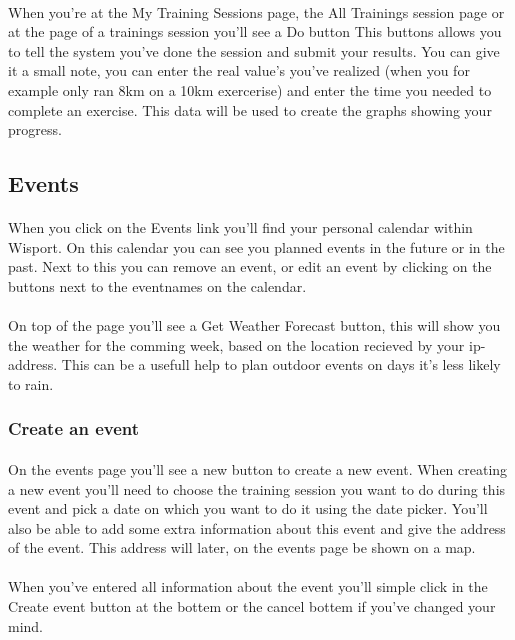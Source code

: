 \documentclass[11pt,a4paper]{scrartcl}
\begin{document}
\paragraph{}When you're at the My Training Sessions page, the All Trainings session page or at the page of a trainings session you'll see a Do button This buttons allows you to tell the system you've done the session and submit your results. You can give it a small note, you can enter the real value's you've realized (when you for example only ran 8km on a 10km exercerise) and enter the time you needed to complete an exercise. This data will be used to create the graphs showing your progress.

\subsection{Events} 
\paragraph{}When you click on the Events link you'll find your personal calendar within Wisport. On this calendar you can see you planned events in the future or in the past. Next to this you can remove an event, or edit an event by clicking on the buttons next to the eventnames on the calendar.
\paragraph{}On top of the page you'll see a Get Weather Forecast button, this will show you the weather for the comming week, based on the location recieved by your ip-address. This can be a usefull help to plan outdoor events on days it's less likely to rain.
\subsubsection{Create an event}
\paragraph{}On the events page you'll see a new button to create a new event. When creating a new event you'll need to choose the training session you want to do during this event and pick a date on which you want to do it using the date picker. You'll also be able to add some extra information about this event and give the address of the event. This address will later, on the events page be shown on a map.
\paragraph{}When you've entered all information about the event you'll simple click in the Create event button at the bottem or the cancel bottem if you've changed your mind.
\end{document}
